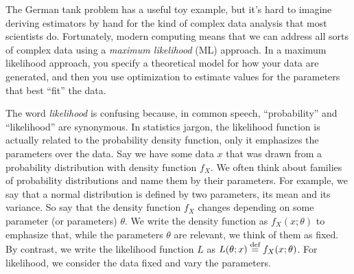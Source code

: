 The German tank problem has a useful toy example, but it's hard to imagine deriving
estimators by hand for the kind of complex data analysis that most scientists do.
Fortunately, modern computing means that we can address all sorts of complex data
using a \emph{maximum likelihood} (ML) approach. In a maximum likelihood approach, you
specify a theoretical model for how your data are generated, and then you use optimization to estimate values for the parameters that best ``fit'' the data.

The word \emph{likelihood} is confusing because, in common speech, ``probability''
and ``likelihood'' are synonymous. In statistics jargon, the likelihood function
is actually related to the probability density function, only it emphasizes the
parameters over the data. Say we have some data $x$ that was drawn from a probability 
distribution with density function $f_X$. We often think about families of probability
distributions and name them by their parameters. For example, we say that a normal
distribution is defined by two parameters, its mean and its variance. So say that
the density function $f_X$ changes depending on some parameter (or parameters) $\theta$.
We write the density function as $f_X(x; \theta)$ to emphasize that, while the
parameters $\theta$ are relevant, we think of them as fixed. By contrast, we write
the likelihood function $L$ as $L(\theta; x) \stackrel{\text{def}}{=} f_X(x; \theta)$. For likelihood,
we consider the data fixed and vary the parameters.

